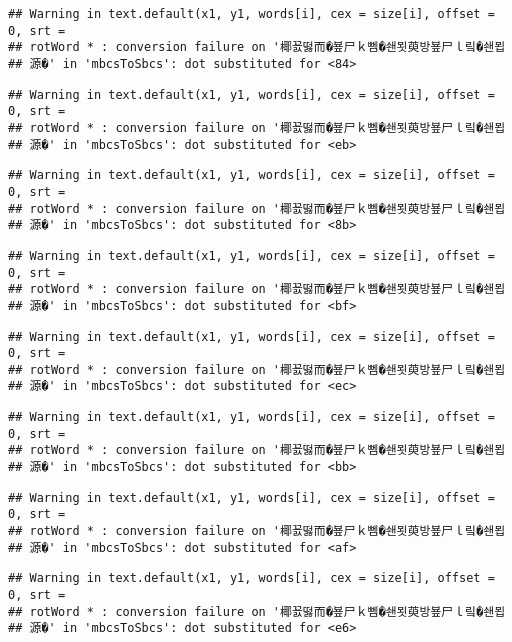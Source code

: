 \documentclass[]{article}
\begin{document}
\begin{verbatim}
## Warning in text.default(x1, y1, words[i], cex = size[i], offset = 0, srt =
## rotWord * : conversion failure on '椰꾨떯而�뵾尸ｋ뻼�쇈묏萸방뵾尸ｌ맄�쇈묍
## 源�' in 'mbcsToSbcs': dot substituted for <84>
\end{verbatim}

\begin{verbatim}
## Warning in text.default(x1, y1, words[i], cex = size[i], offset = 0, srt =
## rotWord * : conversion failure on '椰꾨떯而�뵾尸ｋ뻼�쇈묏萸방뵾尸ｌ맄�쇈묍
## 源�' in 'mbcsToSbcs': dot substituted for <eb>
\end{verbatim}

\begin{verbatim}
## Warning in text.default(x1, y1, words[i], cex = size[i], offset = 0, srt =
## rotWord * : conversion failure on '椰꾨떯而�뵾尸ｋ뻼�쇈묏萸방뵾尸ｌ맄�쇈묍
## 源�' in 'mbcsToSbcs': dot substituted for <8b>
\end{verbatim}

\begin{verbatim}
## Warning in text.default(x1, y1, words[i], cex = size[i], offset = 0, srt =
## rotWord * : conversion failure on '椰꾨떯而�뵾尸ｋ뻼�쇈묏萸방뵾尸ｌ맄�쇈묍
## 源�' in 'mbcsToSbcs': dot substituted for <bf>
\end{verbatim}

\begin{verbatim}
## Warning in text.default(x1, y1, words[i], cex = size[i], offset = 0, srt =
## rotWord * : conversion failure on '椰꾨떯而�뵾尸ｋ뻼�쇈묏萸방뵾尸ｌ맄�쇈묍
## 源�' in 'mbcsToSbcs': dot substituted for <ec>
\end{verbatim}

\begin{verbatim}
## Warning in text.default(x1, y1, words[i], cex = size[i], offset = 0, srt =
## rotWord * : conversion failure on '椰꾨떯而�뵾尸ｋ뻼�쇈묏萸방뵾尸ｌ맄�쇈묍
## 源�' in 'mbcsToSbcs': dot substituted for <bb>
\end{verbatim}

\begin{verbatim}
## Warning in text.default(x1, y1, words[i], cex = size[i], offset = 0, srt =
## rotWord * : conversion failure on '椰꾨떯而�뵾尸ｋ뻼�쇈묏萸방뵾尸ｌ맄�쇈묍
## 源�' in 'mbcsToSbcs': dot substituted for <af>
\end{verbatim}

\begin{verbatim}
## Warning in text.default(x1, y1, words[i], cex = size[i], offset = 0, srt =
## rotWord * : conversion failure on '椰꾨떯而�뵾尸ｋ뻼�쇈묏萸방뵾尸ｌ맄�쇈묍
## 源�' in 'mbcsToSbcs': dot substituted for <e6>
\end{verbatim}
\end{document}
